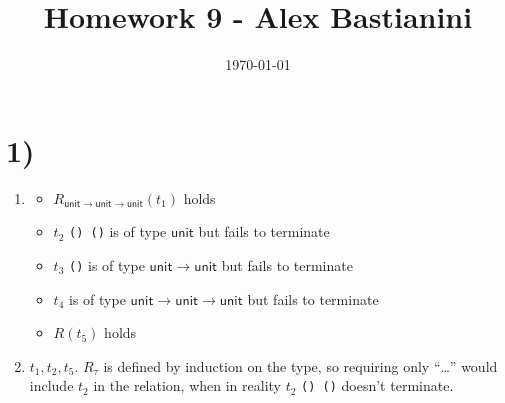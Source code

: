 \documentclass[11pt]{article}
\title{Homework 9 - Alex Bastianini}
\date{
  \today
}
\newcommand{\unit}{\mathsf{unit}}
\begin{document}
\maketitle

\section*{1)}
\begin{enumerate}[label=\alph*.]
  \item
  \begin{itemize}
    \item $R_{\unit \to \unit \to \unit}(t_1)$ holds
    \item $t_2$ \texttt{() ()} is of type $\unit$ but fails to terminate
    \item $t_3$ \texttt{()} is of type $\unit \to \unit$ but fails to terminate
    \item $t_4$ is of type $\unit \to \unit \to \unit$ but fails to terminate
    \item $R(t_5)$ holds
  \end{itemize}

  \item $t_1, t_2, t_5$. $R_\tau$ is defined by induction on the type, so requiring only ``\ldots'' would include $t_2$ in the relation, when in reality $t_2$ \texttt{() ()} doesn't terminate.
\end{enumerate}

\end{document}
